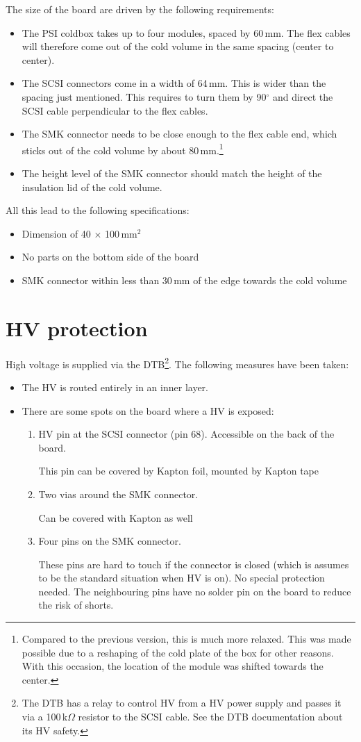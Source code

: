 The size of the board are driven by the following requirements:
\begin{itemize}
    \item The PSI coldbox takes up to four modules, spaced by 60\,mm. The flex cables will therefore come out of the cold volume in the same spacing (center to center).
    \item The SCSI connectors come in a width of 64\,mm. This is wider than the spacing just mentioned. This requires to turn them by 90$^\circ$ and direct the SCSI cable perpendicular to the flex cables.
    \item The SMK connector needs to be close enough to the flex cable end, which sticks out of the cold volume by about 80\,mm.\footnote{Compared to the previous version, this is much more relaxed. This was made possible due to a reshaping of the cold plate of the box for other reasons. With this occasion, the location of the module was shifted towards the center.}
    \item The height level of the SMK connector should match the height of the insulation lid of the cold volume.
\end{itemize}
All this lead to the following specifications:
\begin{itemize}
    \item Dimension of 40 $\times$ 100\,mm$^2$
    \item No parts on the bottom side of the board
    \item SMK connector within less than 30\,mm of the edge towards the cold volume
\end{itemize}

\section{HV protection}
High voltage is supplied via the DTB\footnote{The DTB has a relay to control HV from a HV power supply and passes it via a 100\,k$\Omega$ resistor to the SCSI cable. See the DTB documentation about its HV safety.}. The following measures have been taken:
\begin{itemize}
    \item The HV is routed entirely in an inner layer.
    \item There are some spots on the board where a HV is exposed:
    \begin{enumerate}
	\item HV pin at the SCSI connector (pin 68). Accessible on the back of the board.
    
	This pin can be covered by Kapton foil, mounted by Kapton tape
	\item Two vias around the SMK connector.
    
	Can be covered with Kapton as well
	\item Four pins on the SMK connector.
    
	These pins are hard to touch if the connector is closed (which is assumes to be the standard situation when HV is on). No special protection needed. The neighbouring pins have no solder pin on the board to reduce the risk of shorts.
    \end{enumerate}
\end{itemize}

